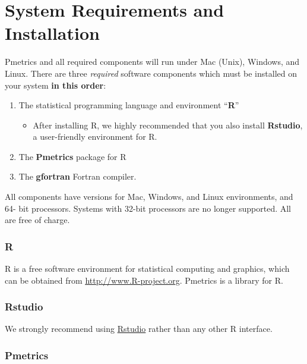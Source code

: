 \documentclass[
]{book}
\providecommand{\tightlist}{%
  \setlength{\itemsep}{0pt}\setlength{\parskip}{0pt}}
\begin{document}
\hypertarget{system-requirements-and-installation}{%
\section{System Requirements and Installation}\label{system-requirements-and-installation}}

Pmetrics and all required components will run under Mac (Unix), Windows,
and Linux. There are three \emph{required} software components
which must be installed on your system \textbf{in this order}:

\begin{enumerate}
\def\labelenumi{\arabic{enumi}.}
\item
  The statistical programming language and environment ``\textbf{R}''

  \begin{itemize}
  \tightlist
  \item
    After installing R, we highly recommended that you also install
    \textbf{Rstudio}, a user-friendly environment for R.
  \end{itemize}
\item
  The \textbf{Pmetrics} package for R
\item
  The \textbf{gfortran} Fortran compiler.
\end{enumerate}

All components have versions for Mac, Windows, and Linux environments,
and 64- bit processors. Systems with 32-bit processors are no longer
supported. All are free of charge.

\hypertarget{r}{%
\subsubsection{R}\label{r}}

R is a free software environment for statistical computing and graphics,
which can be obtained from
\href{http://www.R-project.org}{\uline{http://www.R-project.org}}.
Pmetrics is a library for R.

\hypertarget{rstudio}{%
\subsubsection{Rstudio}\label{rstudio}}

We strongly recommend using \href{http://rstudio.org/}{Rstudio} rather than any
other R interface.

\hypertarget{pmetrics}{%
\subsubsection{Pmetrics}\label{pmetrics}}
\end{document}

